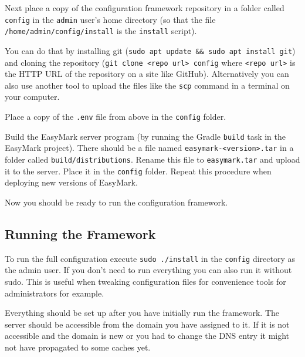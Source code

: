 \documentclass[12pt,a4paper]{report}
\begin{document}
	Next place a copy of the configuration framework repository in a folder called \lstinline|config| in the \lstinline|admin| user's home directory (so that the file \lstinline|/home/admin/config/install| is the \lstinline|install| script).
	
	You can do that by installing git (\lstinline|sudo apt update && sudo apt install git|) and cloning the repository (\lstinline|git clone <repo url> config| where \lstinline|<repo url>| is the HTTP URL of the repository on a site like GitHub). Alternatively you can also use another tool to upload the files like the \lstinline|scp| command in a terminal on your computer.
	
	Place a copy of the \lstinline|.env| file from above in the \lstinline|config| folder.
	
	Build the EasyMark server program (by running the Gradle \lstinline|build| task in the EasyMark project). There should be a file named \lstinline|easymark-<version>.tar| in a folder called \lstinline|build/distributions|. Rename this file to \lstinline|easymark.tar| and upload it to the server. Place it in the \lstinline|config| folder. Repeat this procedure when deploying new versions of EasyMark.
	
	Now you should be ready to run the configuration framework.
	
	\subsection{Running the Framework}
	To run the full configuration execute \lstinline|sudo ./install| in the \lstinline|config| directory as the admin user. If you don't need to run everything you can also run it without sudo. This is useful when tweaking configuration files for convenience tools for administrators for example.
	
	Everything should be set up after you have initially run the framework. The server should be accessible from the domain you have assigned to it. If it is not accessible and the domain is new or you had to change the DNS entry it might not have propagated to some caches yet.
\end{document}
